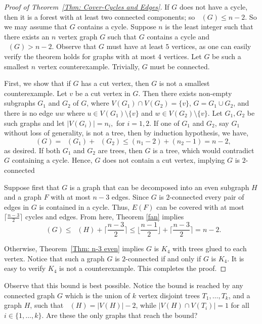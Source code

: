 \documentclass[11pt]{amsart}
\theoremstyle{definition}
\DeclareMathOperator{\Cce}{g_{ce}}
\begin{document}
\begin{proof}[Proof of Theorem~\ref{Thm: Cover-Cycles and Edges}]
If $G$ does not have a cycle, then it is a forest with at least two connected components; so $\Cce(G) \leq n-2$. 
So we may assume that $G$ contains a cycle.
Suppose $n$ is the least integer such that there exists an $n$ vertex graph $G$ such that $G$ contains a cycle and $\Cce(G) > n-2$.
Observe that $G$ must have at least $5$ vertices, 
as one can easily verify the theorem holds for graphs with at most $4$ vertices.
Let $G$ be such a smallest $n$ vertex counterexample.
Trivially, $G$ must be connected.

First, we show that if $G$ has a cut vertex, then $G$ is not a smallest counterexample.
Let
$v$ be a cut vertex in $G$.
Then there exists non-empty subgraphs $G_1$ and $G_2$ of $G$,
where
$V(G_1) \cap V(G_2) = \{v\}$, $G = G_1\cup G_2$, and there is no edge $uw$ where $u\in V(G_1)\setminus \{v\}$ and $w\in V(G_2)\setminus \{v\}$.
Let $G_1,G_2$ be such graphs and let
$|V(G_i)|=n_i,$ for $i=1,2$. 
If one of $G_1$ and $G_2$, say $G_1$ without loss of generality, is not a tree,  then by induction hypothesis, we have, $$\Cce(G)=\Cce(G_1)+\Cce(G_2)\leq (n_1-2)+ (n_2-1)=n-2,$$
as desired. If both $G_1$ and $G_2$ are trees, then $G$ is a tree, which would contradict $G$ containing a cycle.
Hence, $G$ does not contain a cut vertex, implying $G$ is $2$-connected





Suppose first that $G$ is a graph that can be decomposed into an even subgraph $H$ and a graph $F$ with at most $n-3$ edges. 
Since $G$ is $2$-connected every pair of edges in $G$ is contained in a cycle. 
Thus, $E(F)$ can be covered with at most $\lceil \frac{n-3}{2} \rceil$ cycles and edges.
From here, Theorem \ref{fan} implies
\[
\Cce(G) \leq \Cce(H)+ \lceil \frac{n-3}{2} \rceil \leq \lfloor \frac{n-1}{2} \rfloor + \lceil \frac{n-3}{2} \rceil=n-2. 
\]

Otherwise, Theorem~\ref{Thm: n-3 even} implies $G$ is $K_4$ with trees glued to each vertex.
Notice that such a graph $G$ is $2$-connected if and only if $G$ is $K_4$.
It is easy to verify $K_4$ is not a counterexample.
This completes the proof.
\end{proof}









Observe that this bound is best possible.
Notice the bound is reached by any connected graph $G$ which is the union of $k$ vertex disjoint trees $T_1,\dots, T_k$, and a graph $H$,
such that $\Cce(H) = |V(H)| - 2$, while $|V(H) \cap V(T_i)| = 1$ for all $i \in \{1,\dots, k\}$.
Are  these the only graphs that reach the bound?
\end{document}
